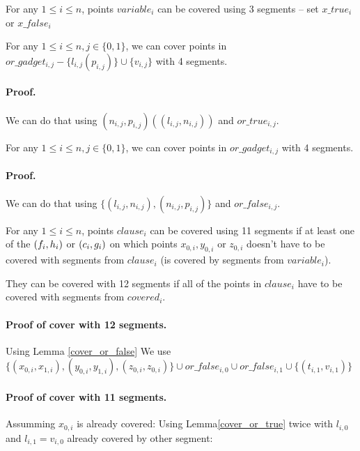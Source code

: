 
\begin{lemma}
\label{choose_variables_solution}
For any $1 \le i \le n$, points $variable_i$
can be covered using 3 segments -- set $x\_true_i$ or $x\_false_i$
\end{lemma}

\begin{lemma}
\label{cover_or_true}
For any $1 \le i \le n, j \in \{0, 1\}$, we can cover points in
$or\_gadget_{i, j} - \{l_{i, j} (p_{i, j})\} \cup \{v_{i, j}\}$
with 4 segments.
\end{lemma}

\paragraph{Proof.}
We can do that using  $(n_{i, j}, p_{i, j}) ((l_{i, j}, n_{i, j})) $
and $or\_true_{i, j}$.

\begin{lemma}
\label{cover_or_false}
For any $1 \le i \le n, j \in \{0, 1\}$, we can cover points in $or\_gadget_{i, j}$
with 4 segments.
\end{lemma}
\paragraph{Proof.}
We can do that using  $\{ (l_{i, j}, n_{i, j}), (n_{i, j}, p_{i, j})\}$
and $or\_false_{i, j}$.


\begin{lemma}
\label{cover_clauses_solution}
For any $1 \le i \le n$, points $clause_i$
can be covered using 11 segments if at least one of the $(f_i, h_i)$
or $(c_i, g_i)$ on which points $x_{0, i}, y_{0, i}$ or $z_{0, i}$
doesn't have to be covered with segments from $clause_i$ (is covered by
segments from $variable_i$).

They can be covered with 12 segments if all of the points in $clause_i$
have to be covered with segments from $covered_i$. 
\end{lemma}

\paragraph{Proof of cover with 12 segments.}
Using Lemma \ref{cover_or_false}
We use 
$\{ (x_{0, i}, x_{1, i}), (y_{0, i}, y_{1, i}),
(z_{0, i}, z_{0, i}) \} \cup or\_false_{i, 0} \cup or\_false_{i, 1} \cup \{ (t_{i, 1}, v_{i, 1}) \}$

\paragraph{Proof of cover with 11 segments.}
Assumming $x_{0, i}$ is already covered:
Using Lemma\ref{cover_or_true} twice with $l_{i, 0}$  and $l_{i, 1} = v_{i, 0}$ already covered by other segment:

